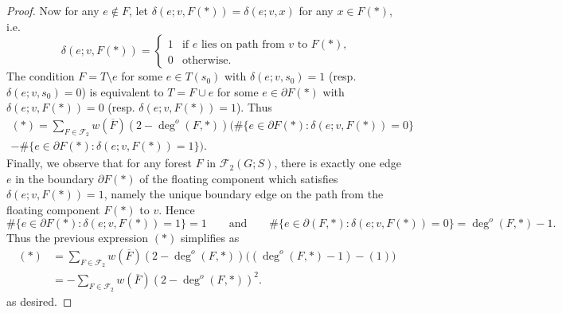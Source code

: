 \documentclass{amsart}
\theoremstyle{definition}
\newcommand{\one}{\mathds{1}}
\newcommand{\trees}{\mathcal{F}_1}
\newcommand{\forests}{\mathcal{F}}
\newcommand{\degout}{\deg^o}
\begin{document}
\begin{proof}
Now for any $e \not\in F$, let $\delta(e; v, F(*)) = \delta(e; v, x)$ for any $x \in F(*)$, i.e.
\[
	\delta(e; v, F(*)) = \begin{cases}
	1 &\text{if $e$ lies on path from $v$ to $F(*)$}, \\
	0 &\text{otherwise}.
	\end{cases}
\]
The condition $F = T \setminus e$ for some $e \in T(s_0)$ with $\delta(e; v, s_0) = 1$ (resp. $\delta(e; v, s_0) = 0$) is equivalent to $T = F \cup e$ for some $e \in \partial F(*)$ with $\delta(e; v, F(*)) = 0$ (resp. $\delta(e; v, F(*)) = 1$).
Thus
\begin{multline}
	(*) = \sum_{F \in \forests_2} w(\overline{F}) (2 - \deg^o(F,*))  \Bigg( \#\{e \in \partial F(*) : \delta(e; v, F(*)) = 0 \}  \\
	- \#\{e \in \partial F(*) : \delta(e; v, F(*)) = 1 \}  \Bigg).
\end{multline}
Finally, we observe that for any forest $F$ in $\forests_2(G;S)$,
there is exactly one edge $e$ in the boundary $\partial F(*)$ of the floating component which satisfies $\delta(e; v, F(*)) = 1$, namely the unique boundary edge on the path from the floating component $F(*)$ to $v$.
Hence
\[
	\#\{e \in \partial F(*) : \delta(e;v, F(*)) = 1 \} = 1
\qquad\text{and}\qquad
	\#\{e \in \partial (F,*) : \delta(e;v, F(*)) = 0 \} = \deg^o(F,*) - 1 .
\]
Thus the previous expression $(*)$ simplifies as
\begin{align*}
	(*) &= \sum_{F \in \forests_2} w(\overline{F}) (2 - \degout(F,*))  \Big( (\degout(F,*) - 1)  - (1) \Big) \\
	&= - \!\sum_{F \in \forests_2} w(\overline{F}) (2 - \degout(F,*))^2 .
\end{align*}
as desired.
\end{proof}
\end{document}
